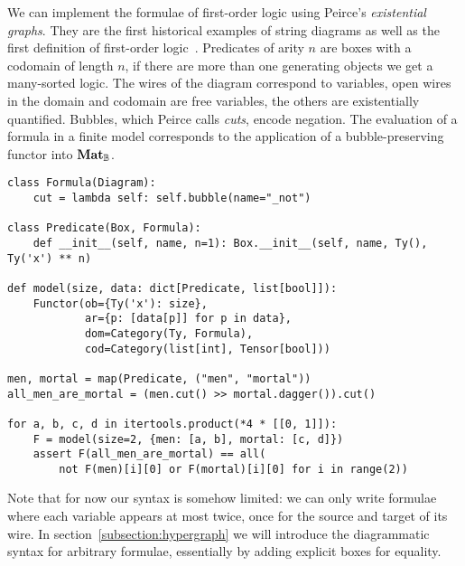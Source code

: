 \begin{example}
We can implement the formulae of first-order logic using Peirce's \emph{existential graphs}.
They are the first historical examples of string diagrams as well as the first definition of first-order logic~\cite{BradyTrimble98,BradyTrimble00,MelliesZeilberger16,HaydonSobocinski20}.
Predicates of arity $n$ are boxes with a codomain of length $n$, if there are more than one generating objects we get a many-sorted logic.
The wires of the diagram correspond to variables, open wires in the domain and codomain are free variables, the others are existentially quantified.
Bubbles, which Peirce calls \emph{cuts}, encode negation.
The evaluation of a formula in a finite model corresponds to the application of a bubble-preserving functor into $\mathbf{Mat}_{\mathbb{B}}$.

\begin{verbatim}
class Formula(Diagram):
    cut = lambda self: self.bubble(name="_not")

class Predicate(Box, Formula):
    def __init__(self, name, n=1): Box.__init__(self, name, Ty(), Ty('x') ** n)

def model(size, data: dict[Predicate, list[bool]]):
    Functor(ob={Ty('x'): size},
            ar={p: [data[p]] for p in data},
            dom=Category(Ty, Formula),
            cod=Category(list[int], Tensor[bool]))

men, mortal = map(Predicate, ("men", "mortal"))
all_men_are_mortal = (men.cut() >> mortal.dagger()).cut()

for a, b, c, d in itertools.product(*4 * [[0, 1]]):
    F = model(size=2, {men: [a, b], mortal: [c, d]})
    assert F(all_men_are_mortal) == all(
        not F(men)[i][0] or F(mortal)[i][0] for i in range(2))
\end{verbatim}

Note that for now our syntax is somehow limited: we can only write formulae where each variable appears at most twice, once for the source and target of its wire.
In section~\ref{subsection:hypergraph} we will introduce the diagrammatic syntax for arbitrary formulae, essentially by adding explicit boxes for equality.
\end{example}

